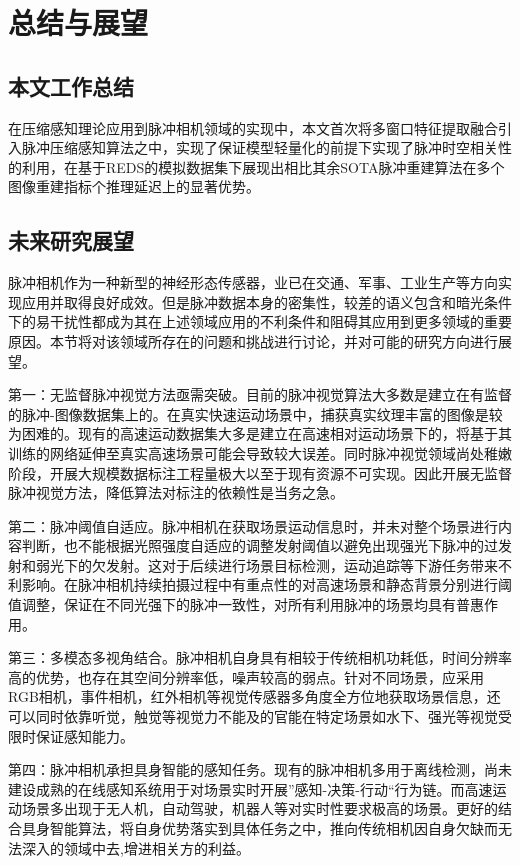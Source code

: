 \chapter{总结与展望}

\section{本文工作总结}
在压缩感知理论应用到脉冲相机领域的实现中，本文首次将多窗口特征提取融合引入脉冲压缩感知算法之中，实现了保证模型轻量化的前提下实现了脉冲时空相关性的利用，在基于REDS的模拟数据集下展现出相比其余SOTA脉冲重建算法在多个图像重建指标个推理延迟上的显著优势。

\section{未来研究展望}
脉冲相机作为一种新型的神经形态传感器，业已在交通、军事、工业生产等方向实现应用并取得良好成效。但是脉冲数据本身的密集性，较差的语义包含和暗光条件下的易干扰性都成为其在上述领域应用的不利条件和阻碍其应用到更多领域的重要原因。本节将对该领域所存在的问题和挑战进行讨论，并对可能的研究方向进行展望。

第一：无监督脉冲视觉方法亟需突破。目前的脉冲视觉算法大多数是建立在有监督的脉冲-图像数据集上的。在真实快速运动场景中，捕获真实纹理丰富的图像是较为困难的。现有的高速运动数据集大多是建立在高速相对运动场景下的，将基于其训练的网络延伸至真实高速场景可能会导致较大误差。同时脉冲视觉领域尚处稚嫩阶段，开展大规模数据标注工程量极大以至于现有资源不可实现。因此开展无监督脉冲视觉方法，降低算法对标注的依赖性是当务之急。

第二：脉冲阈值自适应。脉冲相机在获取场景运动信息时，并未对整个场景进行内容判断，也不能根据光照强度自适应的调整发射阈值以避免出现强光下脉冲的过发射和弱光下的欠发射。这对于后续进行场景目标检测，运动追踪等下游任务带来不利影响。在脉冲相机持续拍摄过程中有重点性的对高速场景和静态背景分别进行阈值调整，保证在不同光强下的脉冲一致性，对所有利用脉冲的场景均具有普惠作用。

第三：多模态多视角结合。脉冲相机自身具有相较于传统相机功耗低，时间分辨率高的优势，也存在其空间分辨率低，噪声较高的弱点。针对不同场景，应采用RGB相机，事件相机，红外相机等视觉传感器多角度全方位地获取场景信息，还可以同时依靠听觉，触觉等视觉力不能及的官能在特定场景如水下、强光等视觉受限时保证感知能力。

第四：脉冲相机承担具身智能的感知任务。现有的脉冲相机多用于离线检测，尚未建设成熟的在线感知系统用于对场景实时开展”感知-决策-行动“行为链。而高速运动场景多出现于无人机，自动驾驶，机器人等对实时性要求极高的场景。更好的结合具身智能算法，将自身优势落实到具体任务之中，推向传统相机因自身欠缺而无法深入的领域中去,增进相关方的利益。